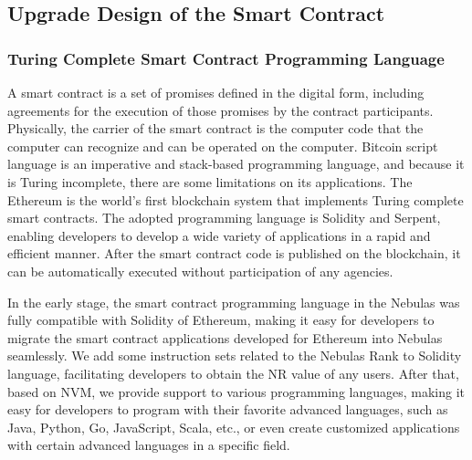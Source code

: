 \subsection{Upgrade Design of the Smart Contract}

\subsubsection{Turing Complete Smart Contract Programming Language}

A smart contract is a set of promises defined in the digital form, including agreements for the execution of those promises by the contract participants. Physically, the carrier of the smart contract is the computer code that the computer can recognize and can be operated on the computer. Bitcoin script language is an imperative and stack-based programming language, and because it is Turing incomplete, there are some limitations on its applications. The Ethereum is the world's first blockchain system that implements Turing complete smart contracts. The adopted programming language is Solidity and Serpent, enabling developers to develop a wide variety of applications in a rapid and efficient manner. After the smart contract code is published on the blockchain, it can be automatically executed without participation of any agencies.


In the early stage, the smart contract programming language in the Nebulas was fully compatible with Solidity of Ethereum, making it easy for developers to migrate the smart contract applications developed for Ethereum into Nebulas seamlessly. We add some instruction sets related to the Nebulas Rank to Solidity language, facilitating developers to obtain the NR value of any users. After that, based on NVM, we provide support to various programming languages, making it easy for developers to program with their favorite advanced languages, such as Java, Python, Go, JavaScript, Scala, etc., or even create customized applications with certain advanced languages in a specific field. 


